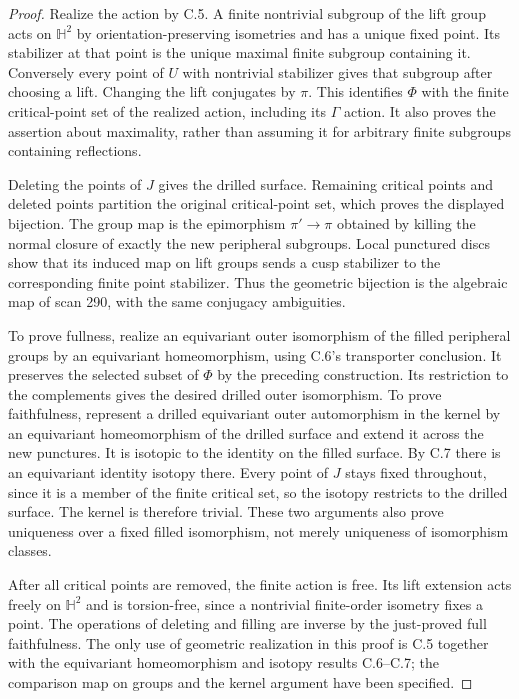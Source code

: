 \begin{proof}
Realize the action by C.5. A finite nontrivial subgroup of the lift group
acts on $\mathbb H^2$ by orientation-preserving isometries and has a
unique fixed point. Its stabilizer at that point is the unique maximal
finite subgroup containing it. Conversely every point of $U$ with
nontrivial stabilizer gives that subgroup after choosing a lift.
Changing the lift conjugates by $\pi$. This identifies $\Phi$ with the
finite critical-point set of the realized action, including its
$\Gamma$ action. It also proves the assertion about maximality, rather
than assuming it for arbitrary finite subgroups containing reflections.

Deleting the points of $J$ gives the drilled surface. Remaining critical
points and deleted points partition the original critical-point set,
which proves the displayed bijection. The group map is the epimorphism
$\pi'\to\pi$ obtained by killing the normal closure of exactly the new
peripheral subgroups. Local punctured discs show that its induced map
on lift groups sends a cusp stabilizer to the corresponding finite
point stabilizer. Thus the geometric bijection is the algebraic map
of scan 290, with the same conjugacy ambiguities.

To prove fullness, realize an equivariant outer isomorphism of the
filled peripheral groups by an equivariant homeomorphism, using C.6's
transporter conclusion. It preserves the selected subset of $\Phi$ by
the preceding construction. Its restriction to the complements gives
the desired drilled outer isomorphism. To prove faithfulness, represent
a drilled equivariant outer automorphism in the kernel by an equivariant
homeomorphism of the drilled surface and extend it across the new
punctures. It is isotopic to the identity on the filled surface. By C.7
there is an equivariant identity isotopy there. Every point of $J$ stays
fixed throughout, since it is a member of the finite critical set, so
the isotopy restricts to the drilled surface. The kernel is therefore
trivial. These two arguments also prove uniqueness over a fixed filled
isomorphism, not merely uniqueness of isomorphism classes.

After all critical points are removed, the finite action is free. Its
lift extension acts freely on $\mathbb H^2$ and is torsion-free, since
a nontrivial finite-order isometry fixes a point. The operations of
deleting and filling are inverse by the just-proved full faithfulness.
The only use of geometric realization in this proof is C.5 together
with the equivariant homeomorphism and isotopy results C.6--C.7; the
comparison map on groups and the kernel argument have been specified.
\end{proof}

